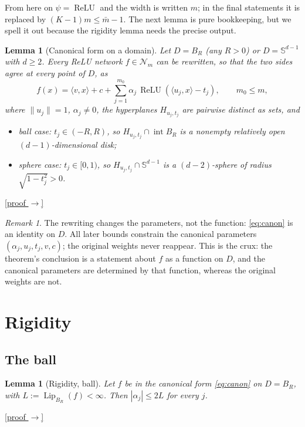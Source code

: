 \documentclass[11pt,reqno]{amsart}
\theoremstyle{plain}
\newtheorem{lemma}[theorem]{Lemma}
\theoremstyle{definition}
\theoremstyle{remark}
\newtheorem{remark}[theorem]{Remark}
\newcommand{\Sd}{\mathbb{S}^{d-1}}
\newcommand{\Lip}{\operatorname{Lip}}
\newcommand{\relu}{\operatorname{ReLU}}
\newcommand{\NN}{\mathcal{N}}
\newcommand{\inn}[2]{\langle #1,#2\rangle}
\newcommand{\proofbutton}[1]{\hyperref[proof:#1]{\textnormal{\footnotesize\textsf{[proof $\to$]}}}}
\begin{document}
From here on $\psi=\relu$ and the width is written $m$; in the final statements it is replaced by $(K-1)m\le\bar m-1$. The next lemma is pure bookkeeping, but we spell it out because the rigidity lemma needs the precise output.

\begin{lemma}[Canonical form on a domain]\label{lem:canonical}
Let $D=B_R$ (any $R>0$) or $D=\Sd$ with $d\ge2$. Every ReLU network $f\in\NN_m$ can be rewritten, so that the two sides agree at every point of $D$, as
\begin{equation}\label{eq:canon}
f(x)=\inn{v}{x}+c+\sum_{j=1}^{m_0}\alpha_j\,\relu(\inn{u_j}{x}-t_j),\qquad m_0\le m,
\end{equation}
where $\|u_j\|=1$, $\alpha_j\neq0$, the hyperplanes $H_{u_j,t_j}$ are pairwise distinct \emph{as sets}, and
\begin{itemize}
\item[(i)] ball case: $t_j\in(-R,R)$, so $H_{u_j,t_j}\cap\operatorname{int}B_R$ is a nonempty relatively open $(d-1)$-dimensional disk;
\item[(ii)] sphere case: $t_j\in[0,1)$, so $H_{u_j,t_j}\cap\Sd$ is a $(d-2)$-sphere of radius $\sqrt{1-t_j^2}>0$.
\end{itemize}
\end{lemma}
\proofbutton{canonical}

\begin{remark}\label{rem:functiondata}
The rewriting changes the parameters, not the function: \eqref{eq:canon} is an identity on $D$. All later bounds constrain the canonical parameters $(\alpha_j,u_j,t_j,v,c)$; the original weights never reappear. This is the crux: the theorem's conclusion is a statement about $f$ as a function on $D$, and the canonical parameters are determined by that function, whereas the original weights are not.
\end{remark}

\section{Rigidity}\label{sec:rigid}

\subsection{The ball}

\begin{lemma}[Rigidity, ball]\label{lem:rigidity}
Let $f$ be in the canonical form \eqref{eq:canon} on $D=B_R$, with $L:=\Lip_{B_R}(f)<\infty$. Then $|\alpha_j|\le 2L$ for every $j$.
\end{lemma}
\proofbutton{rigidity}
\end{document}
